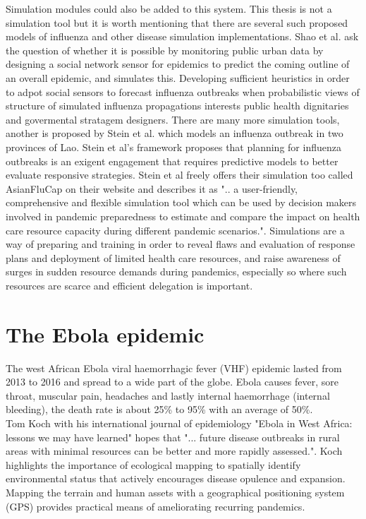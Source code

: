 Simulation modules could also be added to this system. This thesis is not a simulation tool but it is worth mentioning that there are several such proposed models of influenza and other disease simulation implementations. Shao et al. \cite{shao2016forecasting} ask the question of whether it is possible by monitoring public urban data by designing a social network sensor for epidemics to predict the coming outline of an overall epidemic, and simulates this. Developing sufficient heuristics in order to adpot social sensors to forecast influenza outbreaks when probabilistic views of structure of simulated influenza propagations interests public health dignitaries and govermental stratagem designers. There are many more simulation tools, another is proposed by Stein et al. \cite{stein2012development} which models an influenza outbreak in two provinces of Lao. Stein et al's framework proposes that planning for influenza outbreaks is an exigent engagement that requires predictive models to better evaluate responsive strategies. Stein et al freely offers their simulation too called AsianFluCap on their website and describes it as ".. a user-friendly, comprehensive and flexible simulation tool which can be used by decision makers involved in pandemic preparedness to estimate and compare the impact on health care resource capacity during different pandemic scenarios.". Simulations are a way of preparing and training in order to reveal flaws and evaluation of response plans and deployment of limited health care resources, and raise awareness of surges in sudden resource demands during pandemics, especially so where such resources are scarce and efficient delegation is important.

\section{The Ebola epidemic}
The west African Ebola viral haemorrhagic fever (VHF) epidemic lasted from 2013 to 2016 and spread to a wide part of the globe. Ebola causes fever, sore throat, muscular pain, headaches and lastly internal haemorrhage (internal bleeding), the death rate is about 25\% to 95\% with an average of 50\%\cite{who_ebola}. \\

Tom Koch\cite{koch2016ebola} with his international journal of epidemiology "Ebola in West Africa: lessons we may have learned" hopes that "... future disease outbreaks in rural areas with minimal resources can be better and more rapidly assessed.". Koch highlights the importance of ecological mapping to spatially identify environmental status that actively encourages disease opulence and expansion. Mapping the terrain and human assets with a geographical positioning system (GPS) provides practical means of ameliorating recurring pandemics. \\

